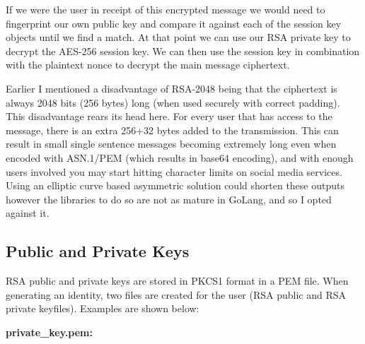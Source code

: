 \documentclass{article}[12pt]
\begin{document}
		If we were the user in receipt of this encrypted message we would need to fingerprint our own public key and compare it against each of the session key objects until we find a match. At that point we can use our RSA private key to decrypt the AES-256 session key. We can then use the session key in combination with the plaintext nonce to decrypt the main message ciphertext.
		
		Earlier I mentioned a disadvantage of RSA-2048 being that the ciphertext is always 2048 bits (256 bytes) long (when used securely with correct padding). This disadvantage rears its head here. For every user that has access to the message, there is an extra 256+32 bytes added to the transmission. This can result in small single sentence messages becoming extremely long even when encoded with ASN.1/PEM (which results in base64 encoding), and with enough users involved you may start hitting character limits on social media services. Using an elliptic curve based asymmetric solution could shorten these outputs however the libraries to do so are not as mature in GoLang, and so I opted against it.
		\newpage
		
	\subsection{Public and Private Keys}
		RSA public and private keys are stored in PKCS1 format in a PEM file. When generating an identity, two files are created for the user (RSA public and RSA private keyfiles). Examples are shown below:
		
		\textbf{private\_key.pem:}
		
\end{document}
